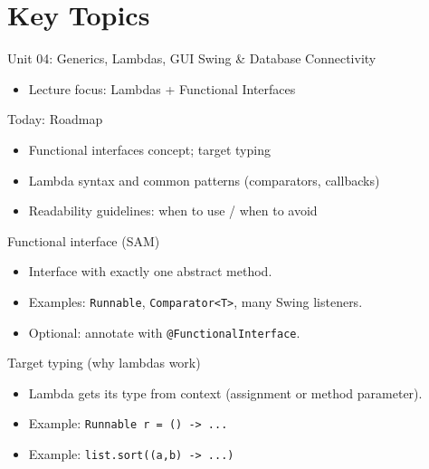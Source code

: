 \documentclass{beamer}
\begin{document}
\section{Key Topics}
\label{sec:concepts}

\begin{frame}{Unit 04: Generics, Lambdas, GUI Swing \& Database Connectivity}
  \begin{itemize}[<+->]
    \item Lecture focus: Lambdas + Functional Interfaces
  \end{itemize}
  \slidesources{\OOPSUnitIVSources}
\end{frame}

\begin{frame}{Today: Roadmap}
  \begin{itemize}[<+->]
    \item Functional interfaces concept; target typing
    \item Lambda syntax and common patterns (comparators, callbacks)
    \item Readability guidelines: when to use / when to avoid
  \end{itemize}
  \slidesources{\OOPSUnitIVSources}
\end{frame}

\begin{frame}{Functional interface (SAM)}
  \begin{itemize}[<+->]
    \item Interface with exactly one abstract method.
    \item Examples: \texttt{Runnable}, \texttt{Comparator<T>}, many Swing listeners.
    \item Optional: annotate with \texttt{@FunctionalInterface}.
  \end{itemize}
  \slidesources{\OOPSUnitIVSources}
\end{frame}

\begin{frame}{Target typing (why lambdas work)}
  \begin{itemize}[<+->]
    \item Lambda gets its type from context (assignment or method parameter).
    \item Example: \texttt{Runnable r = () -> ...}
    \item Example: \texttt{list.sort((a,b) -> ...)}
  \end{itemize}
  \slidesources{\OOPSUnitIVSources}
\end{frame}
\end{document}
